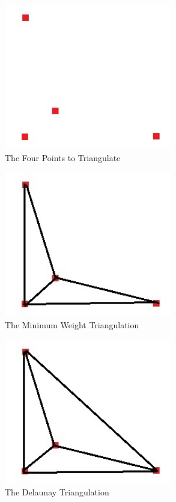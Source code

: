 \documentclass[11pt,psfig]{article}
\begin{document}
\begin{figure}[H]
\centering
\includegraphics[height=2.5in]{hw7prob3diagram1.jpg}
\caption{The Four Points to Triangulate}
\end{figure}

\begin{figure}[H]
\centering
\includegraphics[height=2.5in]{hw7prob3diagram2.jpg}
\caption{The Minimum Weight Triangulation}
\end{figure}

\begin{figure}[H]
\centering
\includegraphics[height=2.5in]{hw7prob3diagram3.jpg}
\caption{The Delaunay Triangulation}
\end{figure}
\end{document}
